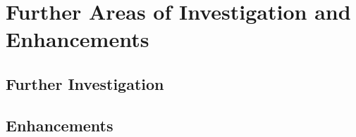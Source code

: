 \section{Further Areas of Investigation and
Enhancements}\label{further-areas-of-investigation-and-enhancements}

\subsection{Further Investigation}\label{further-investigation}

\subsection{Enhancements}\label{enhancements}
